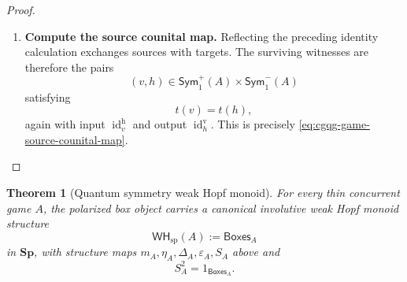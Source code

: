 \documentclass[oneside]{article}
\newcommand{\Boxes}{\mathsf{Boxes}}
\newcommand{\Sym}{\mathsf{Sym}}
\newcommand{\WH}{\mathsf{WH}}
\newcommand{\Sp}{\mathbf{Sp}}
\newcommand{\id}{\operatorname{id}}
\theoremstyle{plain}
\newtheorem{theorem}{Theorem}[section]
\theoremstyle{definition}
\theoremstyle{remark}
\begin{document}
\begin{proof}
\begin{enumerate}[beginpenalty=10000]
        \item \textbf{Compute the source counital map.}
        Reflecting the preceding identity calculation exchanges sources
        with targets. The surviving witnesses are therefore the pairs
        \[
            (v,h)
            \in
            \Sym^+_1(A)\times\Sym^-_1(A)
        \]
        satisfying
        \[
            t(v)=t(h),
        \]
        again with input \(\id_v^{\mathrm h}\) and output
        \(\id_h^{\mathrm v}\). This is precisely
        \eqref{eq:cgqg-game-source-counital-map}. \qedhere
    \end{enumerate}
\end{proof}

\begin{theorem}[Quantum symmetry weak Hopf monoid]
\label{thm:cgqg-span-weak-hopf}
    For every thin concurrent game \(A\), the polarized box object carries a canonical involutive weak Hopf monoid structure
    \begin{equation}
        \WH_{\mathrm{sp}}(A):=\Boxes_A
        \label{eq:cgqg-game-wh-object}
    \end{equation}
    in \(\Sp\), with structure maps \(m_A,\eta_A,\Delta_A,\varepsilon_A,S_A\) above and
    \[
        S_A^2=1_{\Boxes_A}.
    \]
\end{theorem}
\end{document}
